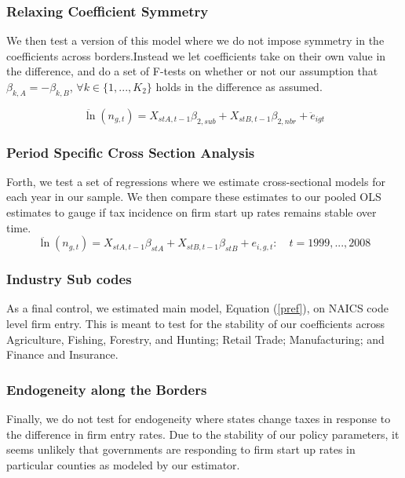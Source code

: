 \subsubsection{Relaxing Coefficient Symmetry}
We then test a version of this model where we do not impose symmetry in the coefficients across borders.Instead we let coefficients take on their own value in the difference, and do a set of F-tests on whether or not our assumption that $\beta_{k,A} = -\beta_{k,B}$, $\forall k \in \{1,...,K_{2}\}$ holds in the difference as assumed.

\begin{equation}\label{sense1}
\ddot \ln(n_{g,t}) = X_{stA,t-1}\beta_{2,sub}+X_{stB,t-1}\beta_{2,nbr}+ \ddot e_{igt} 
\end{equation}

\subsubsection{Period Specific Cross Section Analysis}
Forth, we test a set of regressions where we estimate cross-sectional models for each year in our sample. We then compare these estimates to our pooled OLS estimates to gauge if tax incidence on firm start up rates remains stable over time. 
\begin{equation}\label{sense2}
\ddot \ln(n_{g,t})  = X_{stA,t-1}\beta_{stA}+X_{stB,t-1}\beta_{stB}+ e_{i,g,t}: \quad t = 1999,...,2008
\end{equation}

\subsubsection{Industry Sub codes}

As a final control, we estimated main model, Equation (\ref{pref}), on NAICS code level firm entry. This is meant to test for the stability of our coefficients across Agriculture, Fishing, Forestry, and Hunting; Retail Trade; Manufacturing; and Finance and Insurance.

\subsubsection{Endogeneity along the Borders}

Finally, we do not test for endogeneity where states change taxes in response to the difference in firm entry rates. Due to the stability of our policy parameters, it seems unlikely that governments are responding to firm start up rates in particular counties as modeled by our estimator.
